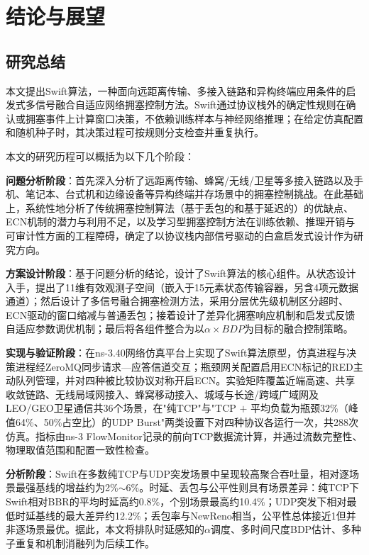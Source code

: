 \chapter{结论与展望}\label{Chap:chap6}

\section{研究总结}\label{Sec6.1}

本文提出Swift算法，一种面向远距离传输、多接入链路和异构终端应用条件的启发式多信号融合自适应网络拥塞控制方法。Swift通过协议栈外的确定性规则在确认或拥塞事件上计算窗口决策，不依赖训练样本与神经网络推理；在给定仿真配置和随机种子时，其决策过程可按规则分支检查并重复执行。

本文的研究历程可以概括为以下几个阶段：

\textbf{问题分析阶段}：首先深入分析了远距离传输、蜂窝/无线/卫星等多接入链路以及手机、笔记本、台式机和边缘设备等异构终端并存场景中的拥塞控制挑战。在此基础上，系统性地分析了传统拥塞控制算法（基于丢包的和基于延迟的）的优缺点、ECN机制的潜力与利用不足，以及学习型拥塞控制方法在训练依赖、推理开销与可审计性方面的工程障碍，确定了以协议栈内部信号驱动的白盒启发式设计作为研究方向。

\textbf{方案设计阶段}：基于问题分析的结论，设计了Swift算法的核心组件。从状态设计入手，提出了11维有效观测子空间（嵌入于15元素状态传输容器，另含4项元数据通道）；然后设计了多信号融合拥塞检测方法，采用分层优先级机制区分超时、ECN驱动的窗口缩减与普通丢包；接着设计了差异化拥塞响应机制和启发式反馈自适应参数调优机制；最后将各组件整合为以$\alpha \times BDP$为目标的融合控制策略。

\textbf{实现与验证阶段}：在ns-3.40网络仿真平台上实现了Swift算法原型，仿真进程与决策进程经ZeroMQ同步请求—应答信道交互；瓶颈网关配置启用ECN标记的RED主动队列管理，并对四种被比较协议对称开启ECN。实验矩阵覆盖近端高速、共享收敛链路、无线局域网接入、蜂窝移动接入、城域与长途/跨域广域网及LEO/GEO卫星通信共36个场景，在"纯TCP"与"TCP $+$ 平均负载为瓶颈32\%（峰值64\%、50\%占空比）的UDP Burst"两类设置下对四种协议各运行一次，共288次仿真。指标由ns-3 FlowMonitor记录的前向TCP数据流计算，并通过流数完整性、物理取值范围和配置一致性检查。

\textbf{分析阶段}：Swift在多数纯TCP与UDP突发场景中呈现较高聚合吞吐量，相对逐场景最强基线的增益约为2\%$\sim$6\%。时延、丢包与公平性则具有场景差异：纯TCP下Swift相对BBR的平均时延高约0.8\%，个别场景最高约10.4\%；UDP突发下相对最低时延基线的最大差异约12.2\%；丢包率与NewReno相当，公平性总体接近1但并非逐场景最优。据此，本文将排队时延感知的$\alpha$调度、多时间尺度BDP估计、多种子重复和机制消融列为后续工作。


